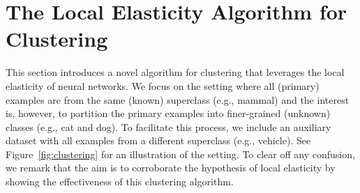 \section{The Local Elasticity Algorithm for Clustering}
\label{sec:local-elast-based}
This section introduces a novel algorithm for clustering that leverages the local elasticity of neural networks. We focus on the setting where all (primary) examples are from the same (known) superclass (e.g., mammal) and the interest is, however, to partition the primary examples into finer-grained (unknown) classes (e.g., cat and dog). To facilitate this process, we include an auxiliary dataset with all examples from a different superclass (e.g., vehicle). See Figure~\ref{fig:clustering} for an illustration of the setting. To clear off any confusion, we remark that the aim is to corroborate the hypothesis of local elasticity by showing the effectiveness of this clustering algorithm. 


